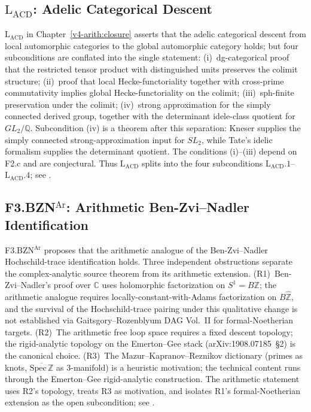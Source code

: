 \subsection{\texorpdfstring{\(\mathrm{L}_{\mathrm{ACD}}\)}{L-ACD}: Adelic Categorical Descent}

\(\mathrm{L}_{\mathrm{ACD}}\) in Chapter~\ref{v4-arith:closure} asserts that
the adelic categorical descent from local automorphic categories to the
global automorphic category holds; but four subconditions are conflated
into the single statement:
(i)~dg-categorical proof that the restricted tensor product with
distinguished units preserves the colimit structure;
(ii)~proof that local Hecke-functoriality together with cross-prime
commutativity implies global Hecke-functoriality on the colimit;
(iii)~sph-finite preservation under the colimit;
(iv)~strong approximation for the simply connected derived group,
together with the determinant idele-class quotient for
\(GL_{2}/\mathbb{Q}\).
Subcondition (iv) is a theorem after this separation: Kneser supplies
the simply connected strong-approximation input for \(SL_{2}\), while
Tate's idelic formalism supplies the determinant quotient. The
conditions (i)--(iii) depend on F2.c and are conjectural.
Thus \(\mathrm{L}_{\mathrm{ACD}}\) splits into the four subconditions
\(\mathrm{L}_{\mathrm{ACD}}.1\)--\(\mathrm{L}_{\mathrm{ACD}}.4\);
see .

\subsection{\texorpdfstring{F3.BZN\(^{\mathrm{Ar}}\)}{F3-BZN-Ar}: Arithmetic Ben-Zvi--Nadler Identification}

F3.BZN\(^{\mathrm{Ar}}\) proposes that the arithmetic analogue of the
Ben-Zvi--Nadler Hochschild-trace identification holds. Three
independent obstructions separate the complex-analytic source theorem
from its arithmetic extension.
(R1)~Ben-Zvi--Nadler's proof over \(\mathbb{C}\) uses holomorphic
factorization on \(S^{1}=B\mathbb{Z}\); the arithmetic analogue requires
locally-constant-with-Adams factorization on \(B\widehat{\mathbb{Z}}\),
and the survival of the Hochschild-trace pairing under this qualitative
change is not established via Gaitsgory--Rozenblyum DAG Vol.~II for
formal-Noetherian targets.
(R2)~The arithmetic free loop space requires a fixed descent topology;
the rigid-analytic topology on the Emerton--Gee stack (arXiv:1908.07185~\S2)
is the canonical choice.
(R3)~The Mazur--Kapranov--Reznikov dictionary (primes as knots,
\(\overline{\mathrm{Spec}\,\mathbb{Z}}\) as 3-manifold) is a heuristic
motivation; the technical content runs through the
Emerton--Gee rigid-analytic construction.
The arithmetic statement uses R2's topology, treats R3 as motivation,
and isolates R1's formal-Noetherian extension as the open
subcondition; see .

